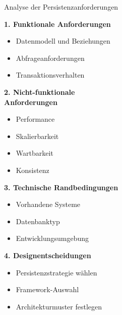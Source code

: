\begin{KR}{Analyse der Persistenzanforderungen}

    \begin{minipage}[t]{0.5\textwidth}
\textbf{1. Funktionale Anforderungen}
\begin{itemize}
    \item Datenmodell und Beziehungen
    \item Abfrageanforderungen
    \item Transaktionsverhalten 
\end{itemize}

\textbf{2. Nicht-funktionale\\ Anforderungen}
\begin{itemize}
    \item Performance
    \item Skalierbarkeit
    \item Wartbarkeit
    \item Konsistenz
\end{itemize}
\end{minipage}
\begin{minipage}[t]{0.5\textwidth}
\textbf{3. Technische Randbedingungen}
\begin{itemize}
    \item Vorhandene Systeme
    \item Datenbanktyp
    \item Entwicklungsumgebung
\end{itemize}

\textbf{4. Designentscheidungen}
\begin{itemize}
    \item Persistenzstrategie wählen
    \item Framework-Auswahl
    \item Architekturmuster festlegen
\end{itemize}
\end{minipage}
\end{KR}

